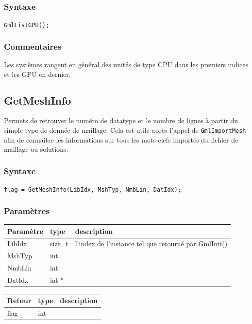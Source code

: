 \documentclass[a4paper,12pt]{article}
\begin{document}
\subsubsection*{Syntaxe}

{\tt GmlListGPU();}

\subsubsection*{Commentaires}
Les systèmes rangent en général des unités de type CPU dans les premiers indices et les GPU en dernier.


\subsection{GetMeshInfo}

Permets de retrouver le numéro de datatype et le nombre de lignes à partir du simple type de donnée de maillage.
Cela est utile après l'appel de {\tt GmlImportMesh} afin de connaitre les informations sur tous les mots-clefs importés du fichier de maillage ou solutions.

\subsubsection*{Syntaxe}

{\tt flag = GetMeshInfo(LibIdx, MshTyp, NmbLin, DatIdx);}

\subsubsection*{Paramètres}

\begin{tabular}{|m{2cm}|m{1.5cm}|m{10.5cm}|}
\hline
Paramètre  & type    & description \\
\hline
LibIdx     & size\_t & l'index de l'instance tel que retourné par GmlInit() \\
\hline
MshTyp     & int     &  \\
\hline
NmbLin     & int     &  \\
\hline
DatIdx     & int *   &  \\
\hline
\end{tabular}

\medskip

\begin{tabular}{|m{2cm}|m{1.5cm}|m{10.5cm}|}
\hline
Retour     & type   & description \\
\hline
flag       & int    & \\
\hline
\end{tabular}
\end{document}
